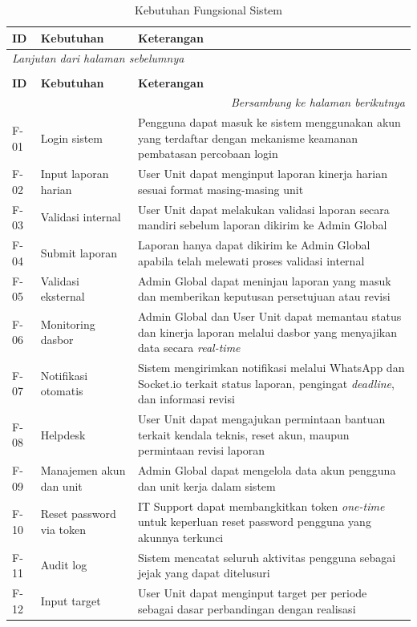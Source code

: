 \begin{longtable}{|p{}|p{}|p{}|}
    \caption{Kebutuhan Fungsional Sistem}
    \label{table:3.fungsional}\\
    \hline
    \textbf{ID} & \textbf{Kebutuhan} & \textbf{Keterangan} \\
    \hline
    \endfirsthead
    \multicolumn{3}{l}{\textit{Lanjutan dari halaman sebelumnya}} \\
    \caption[]{Kebutuhan Fungsional Sistem} \\
    \hline
    \textbf{ID} & \textbf{Kebutuhan} & \textbf{Keterangan} \\
    \hline
    \endhead
    \hline
    \multicolumn{3}{r}{\textit{Bersambung ke halaman berikutnya}} \\
    \endfoot
    \endlastfoot
    F-01 & Login sistem & Pengguna dapat masuk ke sistem menggunakan akun yang terdaftar dengan mekanisme keamanan pembatasan percobaan login \\
    \hline
    F-02 & Input laporan harian & User Unit dapat menginput laporan kinerja harian sesuai format masing-masing unit \\
    \hline
    F-03 & Validasi internal & User Unit dapat melakukan validasi laporan secara mandiri sebelum laporan dikirim ke Admin Global \\
    \hline
    F-04 & Submit laporan & Laporan hanya dapat dikirim ke Admin Global apabila telah melewati proses validasi internal \\
    \hline
    F-05 & Validasi eksternal & Admin Global dapat meninjau laporan yang masuk dan memberikan keputusan persetujuan atau revisi \\
    \hline
    F-06 & Monitoring dasbor & Admin Global dan User Unit dapat memantau status dan kinerja laporan melalui dasbor yang menyajikan data secara \textit{real-time} \\
    \hline
    F-07 & Notifikasi otomatis & Sistem mengirimkan notifikasi melalui WhatsApp dan Socket.io terkait status laporan, pengingat \textit{deadline}, dan informasi revisi \\
    \hline
    F-08 & Helpdesk & User Unit dapat mengajukan permintaan bantuan terkait kendala teknis, reset akun, maupun permintaan revisi laporan \\
    \hline
    F-09 & Manajemen akun dan unit & Admin Global dapat mengelola data akun pengguna dan unit kerja dalam sistem \\
    \hline
    F-10 & Reset password via token & IT Support dapat membangkitkan token \textit{one-time} untuk keperluan reset password pengguna yang akunnya terkunci \\
    \hline
    F-11 & Audit log & Sistem mencatat seluruh aktivitas pengguna sebagai jejak yang dapat ditelusuri \\
    \hline
    F-12 & Input target & User Unit dapat menginput target per periode sebagai dasar perbandingan dengan realisasi \\
    \hline
\end{longtable}

